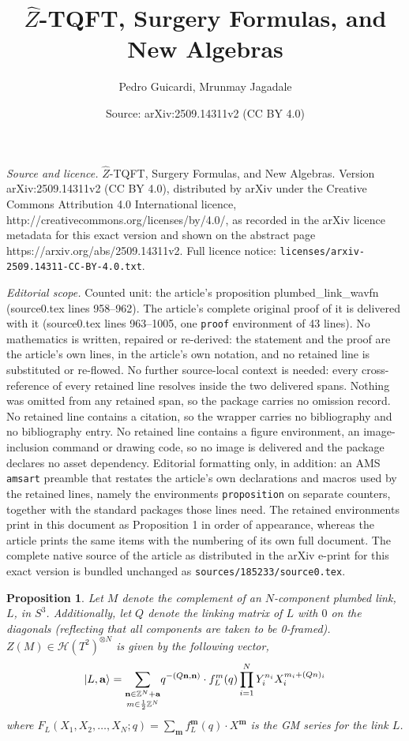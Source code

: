 \documentclass[10pt,a4paper]{amsart}
\title{$\hat{Z}$-TQFT, Surgery Formulas, and New Algebras}
\author{Pedro Guicardi, Mrunmay Jagadale}
\date{Source: arXiv:2509.14311v2 (CC BY 4.0)}
\newtheorem{proposition}{Proposition}
\newcommand{\Z}{{\mathbb Z}}
\begin{document}
\maketitle

\noindent\emph{Source and licence.} $\hat{Z}$-TQFT, Surgery Formulas, and New Algebras. Version arXiv:2509.14311v2 (CC BY 4.0), distributed by arXiv under the Creative Commons Attribution 4.0 International licence, http://creativecommons.org/licenses/by/4.0/, as recorded in the arXiv licence metadata for this exact version and shown on the abstract page https://arxiv.org/abs/2509.14311v2. Full licence notice: \texttt{licenses/arxiv-2509.14311-CC-BY-4.0.txt}.\par\smallskip

\noindent\textit{Editorial scope.} Counted unit: the article's proposition plumbed\_link\_wavfn (source0.tex lines 958--962). The article's complete original proof of it is delivered with it (source0.tex lines 963--1005, one \texttt{proof} environment of 43 lines). No mathematics is written, repaired or re-derived: the statement and the proof are the article's own lines, in the article's own notation, and no retained line is substituted or re-flowed.  No further source-local context is needed: every cross-reference of every retained line resolves inside the two delivered spans.  Nothing was omitted from any retained span, so the package carries no omission record.  No retained line contains a citation, so the wrapper carries no bibliography and no bibliography entry.  No retained line contains a figure environment, an image-inclusion command or drawing code, so no image is delivered and the package declares no asset dependency.  Editorial formatting only, in addition: an AMS \texttt{amsart} preamble that restates the article's own declarations and macros used by the retained lines, namely the environments \texttt{proposition} on separate counters, together with the standard packages those lines need.  The retained environments print in this document as Proposition 1 in order of appearance, whereas the article prints the same items with the numbering of its own full document.  The complete native source of the article as distributed in the arXiv e-print for this exact version is bundled unchanged as \texttt{sources/185233/source0.tex}.
\begin{proposition}\label{plumbed_link_wavfn}
    Let $M$ denote the complement of an $N$-component plumbed link, $L$, in $S^3$. Additionally, let $Q$ denote the linking matrix of $L$ with $0$ on the diagonals (reflecting that all components are taken to be 0-framed). $Z(M) \in \mathcal{H}(T^2)^{\otimes N}$ is given by the following vector,
    $$\ket{L,\mathbf{a}} = \underset{m\in \frac{1}{2}\Z^N}{\sum_{\mathbf{n}\in \Z^N+\mathbf{a}}} q^{-(Q\mathbf{n},\mathbf{n})} \cdot f^m_L(q) \prod^N_{i=1} Y^{n_i}_i X_i^{m_i+(Q n)_i} $$
    where $F_L(X_1,X_2,\ldots,X_N;q) = \sum_{\mathbf{m}}f^\mathbf{m}_L(q) \cdot X^\mathbf{m}$ is the GM series for the link $L$.
\end{proposition}
\end{document}

